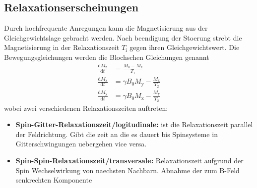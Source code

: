\subsection{Relaxationserscheinungen}%
\label{sub:relaxationserscheinungen}
Durch hochfrequente Anregungen kann die Magnetisierung aus der
Gleichgewichtslage gebracht werden.
Nach beendigung der Stoerung strebt die Magnetisierung in der Relaxationszeit
$T_\text{i}$ gegen ihren Gleichgewichtswert. 
Die Bewegungsgleichungen werden die Blochschen Gleichungen genannt
\begin{align}
		\frac{\text{d} M_\text{z}}{\text{d} t} &= \frac{M_0 - M_\text{z}}{T_1} \\
		\frac{\text{d} M_\text{x}}{\text{d} t} &= \gamma B_0 M_\text{y} -
		\frac{M_\text{x}}{T_2} \\               
		\frac{\text{d} M_\text{y}}{\text{d} t} &= \gamma B_0 M_\text{x} - \frac{M_\text{y}}{T_2} 
\end{align}
wobei zwei verschiedenen Relaxationszeiten auftreten:
\begin{itemize}
		\item \textbf{Spin-Gitter-Relaxationszeit/logitudinale:}
				ist die Relaxationszeit parallel der Feldrichtung. Gibt die zeit
				an die es dauert bis Spinsysteme in Gitterschwingungen
				uebergehen vice versa. 
		\item \textbf{Spin-Spin-Relaxationszeit/transversale:} Relaxationszeit
				aufgrund der Spin Wechselwirkung von naechsten Nachbarn. Abnahme
				der zum B-Feld senkrechten Komponente
\end{itemize}

